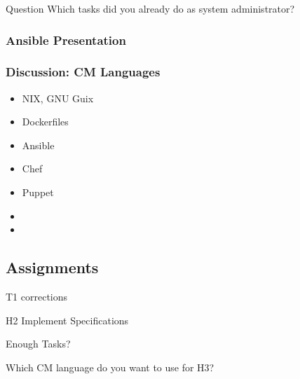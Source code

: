 
\begin{frame}
	\begin{alertblock}{Question}
	Which tasks did you already do as system administrator?
	\end{alertblock}
\end{frame}


\breakframe




\begin{frame}
	\frametitle{Ansible Presentation}
\end{frame}

\begin{frame}
	\frametitle{Discussion: CM Languages}

	\begin{itemize}
	\item NIX, GNU Guix
	\item Dockerfiles
	\item Ansible
	\item Chef
	\item Puppet
	\item
	\item
	\end{itemize}
\end{frame}

\breakframe

\subsection{Assignments}

\begin{assignment}
	T1 corrections
\end{assignment}

\begin{assignment}
	H2 Implement Specifications
\end{assignment}

\begin{assignment}
	Enough Tasks?
\end{assignment}

\begin{assignment}
	Which CM language do you want to use for H3?
\end{assignment}

